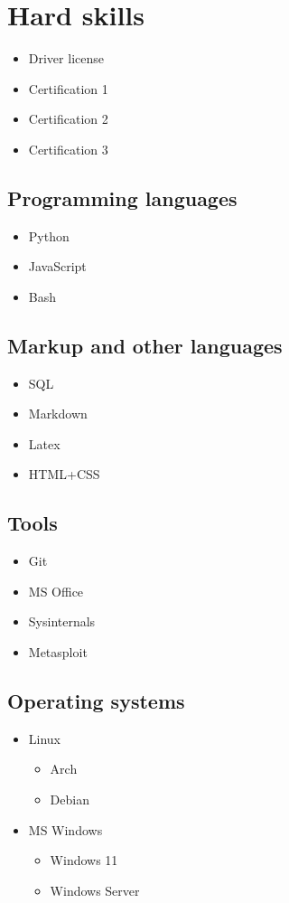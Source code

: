 \documentclass[a4paper,10pt]{article}
\begin{document}
\begin{minipage}[t][0.8\textheight]{0.33\textwidth}
    \section*{Hard skills}
    \begin{itemize}[noitemsep,topsep=0pt]
        \item Driver license
        \item Certification 1
        \item Certification 2
        \item Certification 3
    \end{itemize}
    \subsection{Programming languages}
    \begin{itemize}[noitemsep]
        \item Python
        \item JavaScript
        \item Bash
    \end{itemize}
    \subsection{Markup and other languages}
    \begin{itemize}[noitemsep,topsep=0pt]
        \item SQL
        \item Markdown
        \item Latex
        \item HTML+CSS
    \end{itemize}
    \subsection{Tools}
    \begin{itemize}[noitemsep,topsep=0pt]
        \item Git
        \item MS Office
        \item Sysinternals
        \item Metasploit
    \end{itemize}
    \subsection{Operating systems}
    \begin{itemize}[noitemsep,topsep=0pt]
        \item Linux
        \begin{itemize}
         \item Arch
         \item Debian
        \end{itemize}
        \item MS Windows
        \begin{itemize}
         \item Windows 11
         \item Windows Server
        \end{itemize}
    \end{itemize}

\end{minipage}
\end{document}
